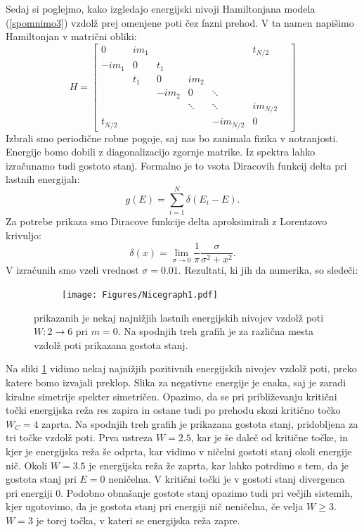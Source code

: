 Sedaj si poglejmo, kako izgledajo energijski nivoji Hamiltonjana modela (\ref{spomnimo3}) vzdolž prej omenjene poti čez fazni prehod. 
V ta namen napišimo Hamiltonjan v matrični obliki:
\[
H = \begin{bmatrix} 
0 & i m_1 &  &  &  & t_{N/2}\\
-i m_1 & 0 & t_1 &  & &  \\
 & t_1 & 0 & im_2 &  &  \\
 &  & -im_2 & 0& \ddots&  & \\
 &  &  & \ddots & \ddots & im_{N/2}  \\
t_{N/2} & & &  & -i m_{N/2} & 0  
    \end{bmatrix}
\]
Izbrali smo periodične robne pogoje, saj nas bo zanimala fizika v notranjosti. Energije bomo dobili z diagonalizacijo zgornje matrike.
Iz spektra lahko izračunamo tudi gostoto stanj. Formalno je to vsota Diracovih funkcij delta pri lastnih energijah:
\begin{equation}
g(E) = \sum_{i=1}^N \delta (E_i - E).
\end{equation}
Za potrebe prikaza smo Diracove funkcije delta aproksimirali z Lorentzovo krivuljo:
\begin{equation}
\delta (x) = \lim_{\sigma \to 0} \frac{1}{\pi} \frac{\sigma}{\sigma^2 + x^2}.
\end{equation}
V izračunih smo vzeli vrednost $\sigma=0.01$.
Rezultati, ki jih da numerika, so sledeči:
\begin{figure}[!h]
\centering
\begin{subfigure}{\textwidth}
\texttt{[image: Figures/Nicegraph1.pdf]}
\end{subfigure}
\caption{prikazanih je nekaj najnižjih lastnih energijskih nivojev vzdolž poti $W: 2 \to 6$ pri $m=0$. Na spodnjih treh grafih je za različna mesta vzdolž poti prikazana gostota stanj.}
\label{fig:Nicegraph1}
\end{figure}
Na sliki \ref{fig:Nicegraph1} vidimo nekaj najnižjih pozitivnih energijskih nivojev vzdolž poti, preko katere bomo izvajali preklop. Slika za negativne energije je enaka, saj je zaradi kiralne simetrije spekter simetričen. Opazimo, da se pri približevanju kritični točki energijska reža res zapira in ostane tudi po prehodu skozi kritično točko $W_C=4$ zaprta. Na spodnjih treh grafih je prikazana gostota stanj, pridobljena za tri točke vzdolž poti. Prva ustreza $W=2.5$, kar je še daleč od kritične točke, in kjer je energijska reža še odprta, kar vidimo v ničelni gostoti stanj okoli energije nič. Okoli $W=3.5$ je energijska reža že zaprta, kar lahko potrdimo s tem, da je gostota stanj pri $E=0$ neničelna. V kritični točki je v gostoti stanj divergenca pri energiji $0$. Podobno obnašanje gostote stanj opazimo tudi pri večjih sistemih, kjer ugotovimo, da je gostota stanj pri energiji nič neničelna, če velja $W\geq 3$. $W=3$ je torej točka, v kateri se energijska reža zapre.
